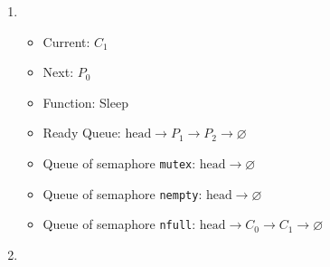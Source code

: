 \documentclass[11pt]{article}
\begin{document}
\begin{question}
\begin{enumerate}
{                }
                \item {
                    \begin{itemize}
                        \item{Current: $C_{1}$}
                        \item{Next: $P_{0}$}
                        \item{Function: Sleep}
                        \item{
                            Ready Queue: $\text{head}\longrightarrow
                            P_{1}\longrightarrow
                            P_{2}\longrightarrow
                            \varnothing$
                        } \item{
                            Queue of semaphore {\tt mutex}: $\text{head}\longrightarrow
                            \varnothing$
                        }
                        \item{
                            Queue of semaphore {\tt nempty}: $\text{head}\longrightarrow
                            \varnothing$
                        }
                        \item{
                            Queue of semaphore {\tt nfull}: $\text{head}\longrightarrow
                            C_{0}\longrightarrow
                            C_{1}\longrightarrow
                            \varnothing$
                        }
                \end{itemize}
                }
                \item {
                    }
\end{enumerate}
\end{question}
\end{document}
